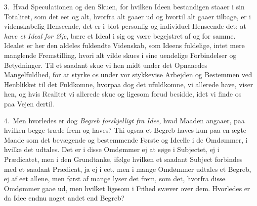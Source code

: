 \documentclass[12pt,a4paper]{book}
\newcommand{\apage}[1]{\marginnote{\footnotesize\textit{[#1]}}}
\begin{document}
3.~Hvad Speculationen og den Skuen, for hvilken Ideen bestandigen staaer i sin
Totalitet,  \apage{125} som det eet og alt, hvorfra alt gaaer ud og hvortil alt gaaer tilbage,
er i videnskabelig Henseende, det er i blot personlig og individuel Henseende
det: at \emph{have et Ideal for Øje}, bære et Ideal i sig og være begejstret af og
for samme. Idealet er her den aldeles fuldendte Videnskab, som Ideens fuldelige,
intet mere manglende Fremstilling, hvori alt vilde skues i sine uendelige
Forbindelser og Betydninger. Til et saadant skue vi hen midt under det Opnaaedes
Mangelfuldhed, for at styrke os under vor stykkevise Arbejden og Bestemmen ved
Henblikket til det Fuldkomne, hvorpaa dog det ufuldkomne, vi allerede have, viser
hen, og hvis Realitet vi allerede skue og ligesom forud besidde, idet vi finde os
paa Vejen dertil.

4.~Men hvorledes er dog \emph{Begreb forskjelligt fra Idee}, hvad Maaden angaaer,
paa hvilken begge træde frem og haves? Thi ogsaa et Begreb haves kun paa en ægte
Maade som det bevægende og bestemmende Første og Ideelle i de Omdømmer, i hvilke
det udtales. Det er i disse Omdømmer ej at søge i Subjectet, ej i Prædicatet, men
i den Grundtanke, ifølge hvilken et saadant Subject forbindes med et saadant
Prædicat, ja ej i eet, men i mange Omdømmer udtales et Begreb, ej af eet allene,
men først af mange lyser det frem, som det, hvorfra disse Omdømmer gaae ud, men
hvilket ligesom i Frihed \apage{126}  svæver over dem. Hvorledes er da Idee endnu noget andet
end Begreb?
\end{document}
